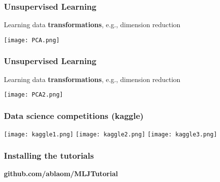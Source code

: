 \documentclass[t]{beamer}
\newcommand\df{\bf\color{Maroon}}
\begin{document}
\begin{frame}
  \frametitle{Unsupervised Learning}
  Learning data {\df transformations}, e.g., dimension reduction
   \begin{center}
    \texttt{[image: PCA.png]}
   \end{center}
\end{frame}

\begin{frame}
  \frametitle{Unsupervised Learning}
  Learning data {\df transformations}, e.g., dimension reduction
   \begin{center}
    \texttt{[image: PCA2.png]}
   \end{center}
\end{frame}

\begin{frame}
  \frametitle{Data science competitions (kaggle)}
  \vspace{-1.0\baselineskip}
    \begin{center}
      \texttt{[image: kaggle1.png]}
      \texttt{[image: kaggle2.png]}
      \texttt{[image: kaggle3.png]}
  \end{center}
\end{frame}

\begin{frame}
  \frametitle{Installing the tutorials}
  \vspace{4\baselineskip}
  \begin{center}
    \Large \df github.com/ablaom/MLJTutorial
  \end{center}
\end{frame}


\begin{frame}
	\finalpage
\end{frame}
\end{document}
